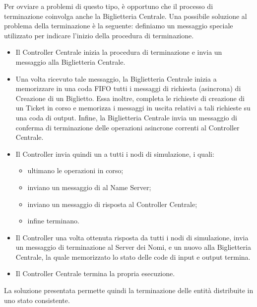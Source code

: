 	Per ovviare a problemi di questo tipo, è opportuno che il processo di terminazione coinvolga anche la Biglietteria Centrale. Una possibile soluzione al problema della terminazione è la seguente: definiamo  un messaggio speciale utilizzato per indicare l'inizio della procedura di terminazione. 
	\begin{itemize}
		\item Il Controller Centrale inizia la procedura di terminazione e invia un messaggio  alla Biglietteria Centrale.
		\item Una volta ricevuto tale messaggio, la Biglietteria Centrale inizia a memorizzare in una coda FIFO tutti i messaggi di richiesta (asincrona) di Creazione di un Biglietto. Essa inoltre, completa le richieste di creazione di un Ticket in corso e memorizza i messaggi in uscita relativi a tali richieste su una coda di output.
		Infine, la Biglietteria Centrale invia un messaggio di conferma di terminazione delle operazioni asincrone correnti al Controller Centrale.
		\item Il Controller invia quindi un  a tutti i nodi di simulazione, i quali:
			\begin{itemize}
				\item ultimano le operazioni in corso;
				\item inviano un messaggio di  al Name Server;
				\item inviano un messaggio di risposta al Controller Centrale;
				\item infine terminano.
			\end{itemize}
		\item Il Controller una volta ottenuta risposta da tutti i nodi di simulazione, invia un messaggio di terminazione al Server dei Nomi, e un nuovo  alla Biglietteria Centrale, la quale memorizzato lo stato delle code di input e output termina.
		\item Il Controller Centrale termina la propria esecuzione.
	\end{itemize}
	
	La soluzione presentata permette quindi la terminazione delle entità distribuite in uno stato consistente.
